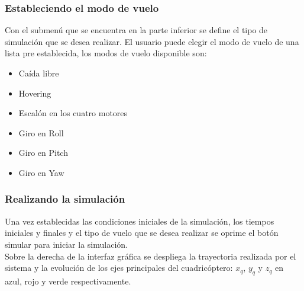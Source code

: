 \documentclass[main]{subfiles}
\begin{document}
\subsubsection*{Estableciendo el modo de vuelo}
Con el submen\'u que se encuentra en la parte inferior se define el tipo de simulaci\'on que se desea realizar. El usuario puede elegir el modo de vuelo de una lista pre establecida, los modos de vuelo disponible son:
\begin{itemize}
\item Ca\'ida libre
\item Hovering
\item Escal\'on en los cuatro motores
\item Giro en Roll
\item Giro en Pitch
\item Giro en Yaw
\end{itemize}

\subsubsection*{Realizando la simulaci\'on}
Una vez establecidas las condiciones iniciales de la simulaci\'on, los tiempos iniciales y finales y el tipo de vuelo que se desea realizar se oprime el bot\'on simular para iniciar la simulaci\'on.\\

Sobre la derecha de la interfaz gr\'afica se despliega la trayectoria realizada por el sistema y la evoluci\'on de los ejes principales del cuadric\'optero: $x_q$, $y_q$ y $z_q$ en azul, rojo y verde respectivamente.\\
\end{document}
